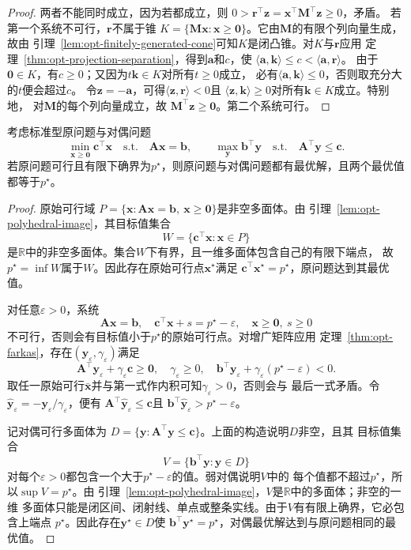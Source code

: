 \begin{proof}
两者不能同时成立，因为若都成立，则
$0>\bm{r}^{\top}\bm{z}
=\bm{x}^{\top}\bm{M}^{\top}\bm{z}\geq0$，矛盾。
若第一个系统不可行，$\bm{r}$不属于锥
$K=\{\bm{M}\bm{x}:\bm{x}\geq\bm{0}\}$。它由$\bm{M}$的有限个列向量生成，故由
引理~\ref{lem:opt-finitely-generated-cone}可知$K$是闭凸锥。对$K$与$\bm{r}$应用
定理~\ref{thm:opt-projection-separation}，得到$\bm{a}$和$c$，使
$\langle\bm{a},\bm{k}\rangle\leq c<\langle\bm{a},\bm{r}\rangle$。
由于$\bm{0}\in K$，有$c\geq0$；又因为$t\bm{k}\in K$对所有$t\geq0$成立，
必有$\langle\bm{a},\bm{k}\rangle\leq0$，否则取充分大的$t$便会超过$c$。
令$\bm{z}=-\bm{a}$，可得$\langle\bm{z},\bm{r}\rangle<0$且
$\langle\bm{z},\bm{k}\rangle\geq0$对所有$\bm{k}\in K$成立。特别地，
对$\bm{M}$的每个列向量成立，故
$\bm{M}^{\top}\bm{z}\geq\bm{0}$。第二个系统可行。
\end{proof}

\begin{theorem}[有限维线性规划强对偶]
\label{thm:opt-lp-strong-duality}
考虑标准型原问题与对偶问题
\[
  \min_{\bm{x}\geq\bm{0}}\bm{c}^{\top}\bm{x}
  \quad\text{s.t.}\quad\bm{A}\bm{x}=\bm{b},
  \qquad
  \max_{\bm{y}}\bm{b}^{\top}\bm{y}
  \quad\text{s.t.}\quad\bm{A}^{\top}\bm{y}\leq\bm{c}.
\]
若原问题可行且有限下确界为$p^\star$，则原问题与对偶问题都有最优解，且两个最优值
都等于$p^\star$。
\end{theorem}

\begin{proof}
原始可行域
$P=\{\bm{x}:\bm{A}\bm{x}=\bm{b},\ \bm{x}\geq\bm{0}\}$是非空多面体。由
引理~\ref{lem:opt-polyhedral-image}，其目标值集合
\[
  W=\{\bm{c}^{\top}\bm{x}:\bm{x}\in P\}
\]
是$\mathbb{R}$中的非空多面体。集合$W$下有界，且一维多面体包含自己的有限下端点，
故$p^\star=\inf W$属于$W$。因此存在原始可行点$\bm{x}^{\star}$满足
$\bm{c}^{\top}\bm{x}^{\star}=p^\star$，原问题达到其最优值。

对任意$\varepsilon>0$，系统
\[
  \bm{A}\bm{x}=\bm{b},\quad
  \bm{c}^{\top}\bm{x}+s=p^\star-\varepsilon,\quad
  \bm{x}\geq\bm{0},\ s\geq0
\]
不可行，否则会有目标值小于$p^\star$的原始可行点。对增广矩阵应用
定理~\ref{thm:opt-farkas}，存在$(\bm{y}_{\varepsilon},\gamma_\varepsilon)$满足
\[
  \bm{A}^{\top}\bm{y}_{\varepsilon}
  +\gamma_\varepsilon\bm{c}\geq\bm{0},\quad
  \gamma_\varepsilon\geq0,\quad
  \bm{b}^{\top}\bm{y}_{\varepsilon}
  +\gamma_\varepsilon(p^\star-\varepsilon)<0.
\]
取任一原始可行$\bar{\bm{x}}$并与第一式作内积可知$\gamma_\varepsilon>0$，否则会与
最后一式矛盾。令
$\widehat{\bm{y}}_\varepsilon=-\bm{y}_\varepsilon/\gamma_\varepsilon$，便有
$\bm{A}^{\top}\widehat{\bm{y}}_\varepsilon\leq\bm{c}$且
$\bm{b}^{\top}\widehat{\bm{y}}_\varepsilon>p^\star-\varepsilon$。

记对偶可行多面体为
$D=\{\bm{y}:\bm{A}^{\top}\bm{y}\leq\bm{c}\}$。上面的构造说明$D$非空，且其
目标值集合
\[
  V=\{\bm{b}^{\top}\bm{y}:\bm{y}\in D\}
\]
对每个$\varepsilon>0$都包含一个大于$p^\star-\varepsilon$的值。弱对偶说明$V$中的
每个值都不超过$p^\star$，所以$\sup V=p^\star$。由
引理~\ref{lem:opt-polyhedral-image}，$V$是$\mathbb{R}$中的多面体；非空的一维
多面体只能是闭区间、闭射线、单点或整条实线。由于$V$有有限上确界，它必包含上端点
$p^\star$。因此存在$\bm{y}^{\star}\in D$使
$\bm{b}^{\top}\bm{y}^{\star}=p^\star$，对偶最优解达到与原问题相同的最优值。
\end{proof}


